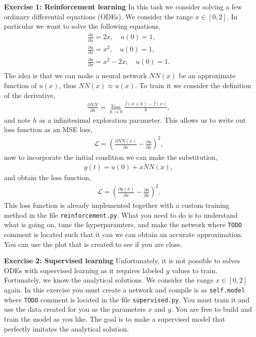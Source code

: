 \documentclass[12pt,a4paper]{article} %
\numberwithin{equation}{section}
\newcommand{\paa}[1]{\left(#1\right)}
\newcommand{\pd}{\partial}
\begin{document}
		\textbf{Exercise 1: Reinforcement learning}\newline
			In this task we consider solving a few ordinary differential equations (ODEs). We consider the range $x \in [0,2]$. In particular we want to solve the following equations,
			\begin{gather}
				\frac{\pd u}{\pd x} = 2x, \quad u(0) = 1,\\
				\frac{\pd u}{\pd x} = x^2, \quad u(0) = 1,\\
				\frac{\pd u}{\pd x} = x^2 - 2x, \quad u(0) = 1.\\
			\end{gather} 
			The idea is that we can make a neural network $NN(x)$ be an approximate function of $u(x)$, thus $NN(x) \approx u(x)$. To train it we consider the definition of the derivative,
			\begin{gather}
				\frac{\pd NN}{\pd x}= \lim_{h\rightarrow 0} \frac{f(x+h) - f(x)}{h},
			\end{gather} 
			and note $h$ as a infinitesimal exploration parameter. This allows us to write out loss function as an MSE loss, 
			\begin{gather}
				\mathcal{L} = \paa{\frac{\pd NN(x)}{\pd x} -\frac{\pd u}{\pd x}}^2,
			\end{gather}
			now to incorporate the initial condition we can make the substitution, 
			\begin{gather}
				g(t) = u(0) + x NN(x),
			\end{gather} 
			and obtain the loss function,
			\begin{gather}
				\mathcal{L} =\paa{\frac{\pd g(x)}{\pd x} -\frac{\pd u}{\pd x}}^2.
			\end{gather}
			This loss function is already implemented together with a custom training method in the file \texttt{reinforcement.py}.
			What you need to do is to understand what is going on, tune the hyperparamters, and make the network where \texttt{TODO} comment is located such that it can we can obtain an accurate approximation. You can use the plot that is created to see if you are close.\newline
		
		\textbf{Exercise 2: Supervised learning}\newline
			Unfortunately, it is not possible to solves ODEs with supervised learning as it requires labeled $y$ values to train. Fortunately, we know the analytical solutions.  We consider the range $x \in [0,2]$ again. In this exercise you must create a network and compile is as \texttt{self.model} where \texttt{TODO} comment is located in the file \texttt{supervised.py}. You must train it and use the data created for you as the parameters $x$ and $y$. You are free to build and train the model as you like. The goal is to make a supervised model that perfectly imitates the analytical solution.
			\newline
			
\end{document}
